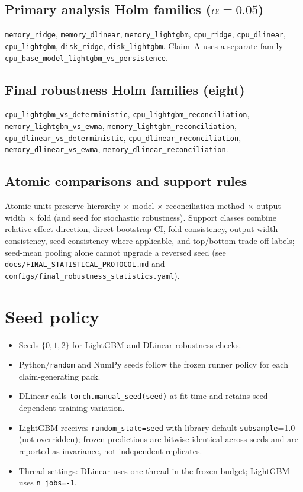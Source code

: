 \documentclass[a4paper,11pt]{article}
\begin{document}
\subsection*{Primary analysis Holm families ($\alpha=0.05$)}
\texttt{memory\_ridge}, \texttt{memory\_dlinear}, \texttt{memory\_lightgbm},
\texttt{cpu\_ridge}, \texttt{cpu\_dlinear}, \texttt{cpu\_lightgbm},
\texttt{disk\_ridge}, \texttt{disk\_lightgbm}.
Claim~A uses a separate family
\texttt{cpu\_base\_model\_lightgbm\_vs\_persistence}.

\subsection*{Final robustness Holm families (eight)}
\texttt{cpu\_lightgbm\_vs\_deterministic},
\texttt{cpu\_lightgbm\_reconciliation},
\texttt{memory\_lightgbm\_vs\_ewma},
\texttt{memory\_lightgbm\_reconciliation},
\texttt{cpu\_dlinear\_vs\_deterministic},
\texttt{cpu\_dlinear\_reconciliation},
\texttt{memory\_dlinear\_vs\_ewma},
\texttt{memory\_dlinear\_reconciliation}.

\subsection*{Atomic comparisons and support rules}
Atomic units preserve hierarchy $\times$ model $\times$ reconciliation method
$\times$ output width $\times$ fold (and seed for stochastic robustness).
Support classes combine relative-effect direction, direct bootstrap CI, fold
consistency, output-width consistency, seed consistency where applicable, and
top/bottom trade-off labels; seed-mean pooling alone cannot upgrade a reversed
seed (see \texttt{docs/FINAL\_STATISTICAL\_PROTOCOL.md} and
\texttt{configs/final\_robustness\_statistics.yaml}).

\section{Seed policy}
\begin{itemize}
  \item Seeds $\{0,1,2\}$ for LightGBM and DLinear robustness checks.
  \item Python/\texttt{random} and NumPy seeds follow the frozen runner policy
    for each claim-generating pack.
  \item DLinear calls \texttt{torch.manual\_seed(seed)} at fit time and retains
    seed-dependent training variation.
  \item LightGBM receives \texttt{random\_state=seed} with library-default
    \texttt{subsample}=1.0 (not overridden); frozen predictions are bitwise
    identical across seeds and are reported as invariance, not independent
    replicates.
  \item Thread settings: DLinear uses one thread in the frozen budget; LightGBM
    uses \texttt{n\_jobs=-1}.
\end{itemize}
\end{document}
